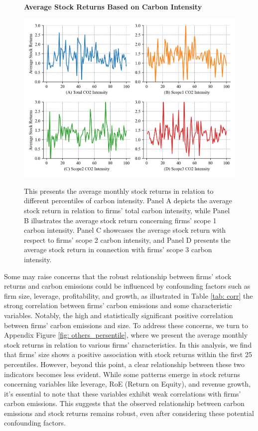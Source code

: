 \documentclass[12pt]{article}
\begin{document}
\begin{figure}[!ht]
\centering
\caption{\textbf{Average Stock Returns Based on Carbon Intensity}}
\includegraphics{graphics/int_percentile.png}
\label{fig: intensity_percentile}
\caption*{\footnotesize{This presents the average monthly stock returns in relation to different percentiles of carbon intensity. Panel A depicts the average stock return in relation to firms' total carbon intensity, while Panel B illustrates the average stock return concerning firms' scope 1 carbon intensity. Panel C showcases the average stock return with respect to firms' scope 2 carbon intensity, and Panel D presents the average stock return in connection with firms' scope 3 carbon intensity.}}
\end{figure}

Some may raise concerns that the robust relationship between firms' stock returns and carbon emissions could be influenced by confounding factors such as firm size, leverage, profitability, and growth, as illustrated in Table \ref{tab: corr} the strong correlation between firms' carbon emissions and some characteristic variables. Notably, the high and statistically significant positive correlation between firms' carbon emissions and size. To address these concerns, we turn to Appendix Figure \ref{fig: others_persentile}, where we present the average monthly stock returns in relation to various firms' characteristics. In this analysis, we find that firms' size shows a positive association with stock returns within the first 25 percentiles. However, beyond this point, a clear relationship between these two indicators becomes less evident. While some patterns emerge in stock returns concerning variables like leverage, RoE (Return on Equity), and revenue growth, it's essential to note that these variables exhibit weak correlations with firms' carbon emissions. This suggests that the observed relationship between carbon emissions and stock returns remains robust, even after considering these potential confounding factors.
\end{document}
